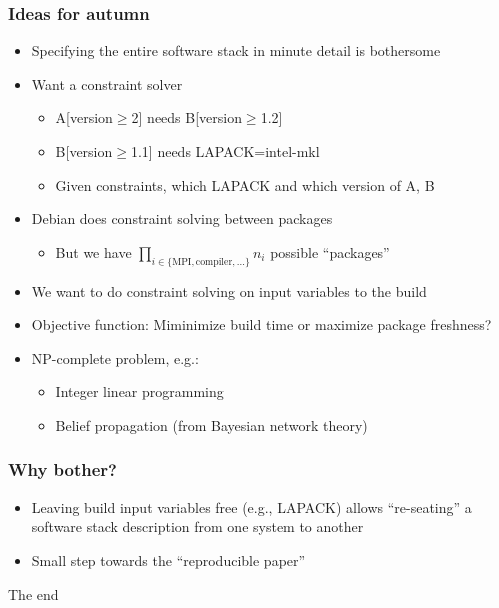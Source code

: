 \documentclass[sans,mathserif]{beamer}
\begin{document}
\begin{frame}
  \frametitle{Ideas for autumn}

  \begin{itemize}
  \item<+-> Specifying the entire software stack in minute detail is bothersome
  \item<+-> Want a constraint solver
    \begin{itemize}
    \item A[version$\ge$2] needs B[version$\ge$1.2]
    \item B[version$\ge$1.1] needs LAPACK=intel-mkl
    \item Given constraints, which LAPACK and which version of A, B
    \end{itemize}
  \item<+-> Debian does constraint solving between packages
    \begin{itemize}
    \item But we have $\prod_{i\in\{\text{MPI},\text{compiler},...\}} n_i$ possible ``packages''
    \end{itemize}
  \item<+-> We want to do constraint solving on input variables to the build
  \item<+-> Objective function: Miminimize build time or maximize package freshness?
  \item<+-> NP-complete problem, e.g.:
    \begin{itemize}
    \item Integer linear programming
    \item Belief propagation (from Bayesian network theory)
    \end{itemize}
  \end{itemize}

\end{frame}

\begin{frame}
  \frametitle{Why bother?}

  \begin{itemize}
  \item<+-> Leaving build input variables free (e.g., LAPACK)
    allows ``re-seating'' a software stack description from one system
    to another
  \item<+-> Small step towards the ``reproducible paper''
  \end{itemize}
\end{frame}

\begin{frame}
  \begin{center}
    {\Large The end}
  \end{center}
\end{frame}
\end{document}
